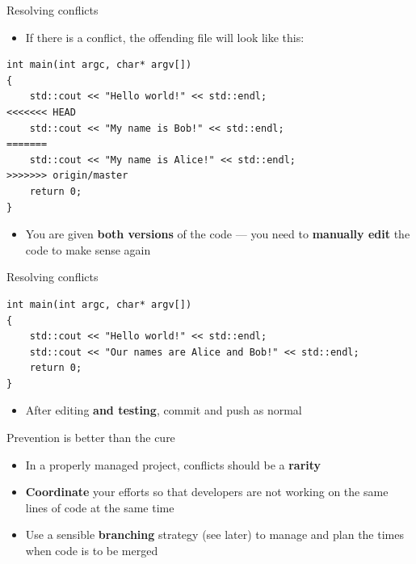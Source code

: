 \begin{frame}[fragile]{Resolving conflicts}
    \begin{itemize}
        \item If there is a conflict, the offending file will look like this:
    \end{itemize}
    \begin{lstlisting}
int main(int argc, char* argv[])
{
    std::cout << "Hello world!" << std::endl;
<<<<<<< HEAD
    std::cout << "My name is Bob!" << std::endl;
=======
    std::cout << "My name is Alice!" << std::endl;
>>>>>>> origin/master
    return 0;
}
    \end{lstlisting}
    \begin{itemize}
        \item You are given \textbf{both versions} of the code ---
            you need to \textbf{manually edit} the code to make sense again
    \end{itemize}
\end{frame}

\begin{frame}[fragile]{Resolving conflicts}
    \begin{lstlisting}
int main(int argc, char* argv[])
{
    std::cout << "Hello world!" << std::endl;
    std::cout << "Our names are Alice and Bob!" << std::endl;
    return 0;
}
    \end{lstlisting}
    \begin{itemize}
        \item After editing \textbf{and testing}, commit and push as normal
    \end{itemize}
\end{frame}

\begin{frame}[fragile]{Prevention is better than the cure}
    \begin{itemize}
        \item In a properly managed project, conflicts should be a \textbf{rarity}
        \item \textbf{Coordinate} your efforts so that developers are not working on the same lines of code
            at the same time
        \item Use a sensible \textbf{branching} strategy (see later) to manage and plan the times when
            code is to be merged
    \end{itemize}
\end{frame}

